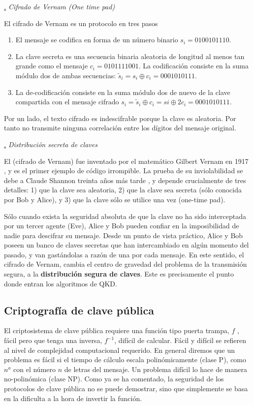 \documentclass[a4paper,11pt]{book} %
\numberwithin{equation}{chapter}
\def\subsubiContadorIt{\par\addtocounter{subsubsection}{1}\underline{\it\thesubsubsection.}\hskip0.5cm \setcounter{subsubsubsectionIt}{0}}
\newcommand{\SubsubiIt}[1]{
		\subsubiContadorIt \textit{#1}
	}
\newcounter{subsubsubsectionIt}[subsubsection]
\begin{document}
			\SubsubiIt{Cifrado de Vernam (One time pad)}

El cifrado de Vernam es un protocolo en tres pasos
\begin{enumerate}
	\item El mensaje se codifica en forma de un número binario $s_i = 0100101110$.
	\item La clave secreta es una secuencia binaria aleatoria de longitud al menos tan grande como el mensaje $c_i = 0101111001$. La codificación consiste en la suma módulo dos de ambas secuencias: 
	$\tilde{s}_i = s_i \oplus c_i = 0001010111$.
	\item La de-codificación consiste en la suma módulo dos de nuevo de la clave compartida con el mensaje cifrado $s_i = \tilde{s}_i \oplus c_i = si \oplus 2c_i = 0001010111$.
\end{enumerate}
Por un lado, el texto cifrado es indescifrable porque la clave es aleatoria. Por tanto no transmite ninguna correlación entre los dígitos del mensaje original.

			\SubsubiIt{Distribución secreta de claves}
			
El (cifrado de Vernam) fue inventado por el matemático Gilbert Vernam en 1917 \cite{Vernam-1926}, y es el primer ejemplo
de código irrompible. La prueba de su inviolabilidad se debe a Claude Shannon treinta años más tarde \cite{Shannon-1949},
y depende crucialmente de tres detalles: 1) que la clave sea aleatoria, 2) que la clave sea secreta (sólo
conocida por Bob y Alice), y 3) que la clave sólo se utilice una vez (one-time pad).

Sólo cuando exista la seguridad absoluta de que la clave no ha sido interceptada por un tercer agente
(Eve), Alice y Bob pueden confiar en la imposibilidad de nadie para descifrar su mensaje. Desde un
punto de vista práctico, Alice y Bob poseen un banco de claves secretas que han intercambiado en algún
momento del pasado, y van gastándolas a razón de una por cada mensaje. En este sentido, el cifrado de
Vernam, cambia el centro de gravedad del problema de la transmisión segura, a la \textbf{distribución segura de
claves}. Este es precisamente el punto donde entran los algoritmos de QKD.


		\subsection{Criptografía de clave pública}

	El criptosistema de clave pública requiere una función tipo puerta trampa, $f$ , fácil pero que tenga una inversa, $f^{-1}$, difícil de calcular. Fácil y difícil se refieren al nivel de complejidad computacional requerido. En general diremos que un problema es fácil si el tiempo de cálculo escala polinómicamente (clase P), como $n^a$ con el número $n$ de letras del mensaje. Un problema difícil lo hace de manera no-polinómica (clase NP). Como ya se ha comentado, la seguridad de los protocolos de clave pública no se puede demostrar, sino que simplemente se basa en la dificulta a la hora de invertir la función. 
	
\end{document}
